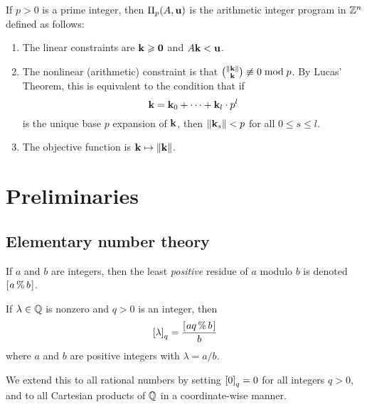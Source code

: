 \documentclass[11pt]{amsart}
\renewcommand{\!}[1]{{\color{red}\text{$\star$\,}#1\,$\star$}}
\begin{document}


\begin{definition} If $p>0$ is a prime integer, then $\Pi_p(A, \mathbf{u})$ is the arithmetic integer program in $\mathbb{Z}^n$ defined as follows:
\begin{enumerate}
\item The linear constraints are $\mathbf{k} \geqslant \mathbf{0}$ and $A \mathbf{k} < \mathbf{u}$.  
\item The nonlinear (arithmetic) constraint is that $\binom{\| \mathbf{k} \|}{\mathbf{k}} \not \equiv 0 \bmod p$.  By Lucas' Theorem, this is equivalent to the condition that  if \[ \mathbf{k} = \mathbf{k}_0 + \cdots + \mathbf{k}_l \cdot  p^l\] is the unique base $p$ expansion of $\mathbf{k}$, then $\| \mathbf{k}_s \| < p$ for all $0 \leq s \leq l $.
\item The objective function is $\mathbf{k} \mapsto \| \mathbf{k} \|$.
\end{enumerate}
\end{definition}


\newpage

\section{Preliminaries}



\subsection{Elementary number theory}   


If $a$ and $b$ are integers, then the least \emph{positive} residue of $a$ modulo $b$ is denoted $[ \hspace{.01in} a \, \% \, b \hspace{.01in} ]$. 




\begin{definition}  If $\lambda \in \mathbb{Q}$ is nonzero and $q>0$ is an integer, then \[ \left[ \lambda \right]_q = \frac{ [ \hspace{.01in} aq \, \% \, b \hspace{.01in} ]}{b} \] 
where $a$ and $b$ are positive integers with $\lambda = a/b$.

We extend this to all rational numbers by setting $\left[ 0 \right]_q = 0$ for all integers $q>0$, and to all Cartesian products of $\mathbb{Q}$ in a coordinate-wise manner.
\end{definition}
\end{document}
